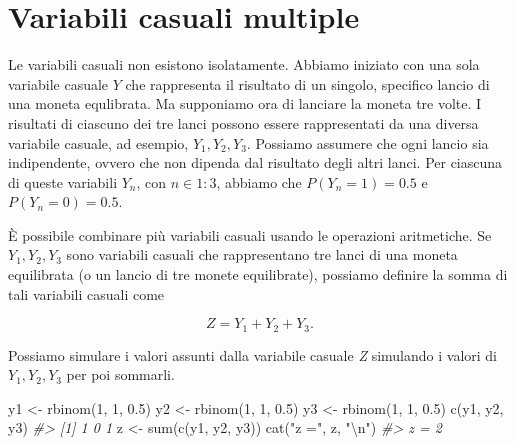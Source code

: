 \documentclass[
  11pt,
]{krantz}
\makeatletter
\newenvironment{Shaded}{\begin{snugshade}}{\end{snugshade}}
\newcommand{\CommentTok}[1]{\textcolor[rgb]{0.37,0.37,0.37}{\textit{#1}}}
\newcommand{\DecValTok}[1]{\textcolor[rgb]{0.06,0.06,0.06}{#1}}
\newcommand{\FloatTok}[1]{\textcolor[rgb]{0.06,0.06,0.06}{#1}}
\newcommand{\FunctionTok}[1]{\textcolor[rgb]{0,0,0}{#1}}
\newcommand{\NormalTok}[1]{#1}
\newcommand{\OtherTok}[1]{\textcolor[rgb]{0.37,0.37,0.37}{#1}}
\newcommand{\SpecialCharTok}[1]{\textcolor[rgb]{0,0,0}{#1}}
\newcommand{\StringTok}[1]{\textcolor[rgb]{0.5,0.5,0.5}{#1}}
\newenvironment{kframe}{%
\medskip{}
\setlength{\fboxsep}{.8em}
 \def\at@end@of@kframe{}%
 \ifinner\ifhmode%
  \def\at@end@of@kframe{\end{minipage}}%
  \begin{minipage}{\columnwidth}%
 \fi\fi%
 \def\FrameCommand##1{\hskip\@totalleftmargin \hskip-\fboxsep
 \colorbox{shadecolor}{##1}\hskip-\fboxsep
     \hskip-\linewidth \hskip-\@totalleftmargin \hskip\columnwidth}%
 \MakeFramed {\advance\hsize-\width
   \@totalleftmargin\z@ \linewidth\hsize
   \@setminipage}}%
 {\par\unskip\endMakeFramed%
 \at@end@of@kframe}
\renewenvironment{Shaded}{\begin{kframe}}{\end{kframe}}
\theoremstyle{definition}
\theoremstyle{definition}
\theoremstyle{definition}
\theoremstyle{definition}
\theoremstyle{remark}
\makeatother
\begin{document}
\hypertarget{variabili-casuali-multiple}{%
\section{Variabili casuali multiple}\label{variabili-casuali-multiple}}

Le variabili casuali non esistono isolatamente. Abbiamo iniziato con una sola variabile casuale \(Y\) che rappresenta il risultato di un singolo, specifico lancio di una moneta equlibrata. Ma supponiamo ora di lanciare la moneta tre volte. I risultati di ciascuno dei tre lanci possono essere rappresentati da una diversa variabile casuale, ad esempio, \(Y_1 , Y_2 , Y_3\). Possiamo assumere che ogni lancio sia indipendente, ovvero che non dipenda dal risultato degli altri lanci. Per ciascuna di queste variabili \(Y_n\), con \(n \in 1:3\), abbiamo che \(P(Y_n =1)=0.5\) e \(P(Y_n =0)=0.5\).

È possibile combinare più variabili casuali usando le operazioni aritmetiche. Se \(Y_1 , Y_2, Y_3\) sono variabili casuali che rappresentano tre lanci di una moneta equilibrata (o un lancio di tre monete equilibrate), possiamo definire la somma di tali variabili casuali come

\[
Z = Y_1 + Y_2 + Y_3.
\]

Possiamo simulare i valori assunti dalla variabile casuale \emph{Z} simulando i valori di \(Y_1, Y_2, Y_3\) per poi sommarli.

\begin{Shaded}
\begin{Highlighting}[]
\NormalTok{y1 }\OtherTok{\textless{}{-}} \FunctionTok{rbinom}\NormalTok{(}\DecValTok{1}\NormalTok{, }\DecValTok{1}\NormalTok{, }\FloatTok{0.5}\NormalTok{)}
\NormalTok{y2 }\OtherTok{\textless{}{-}} \FunctionTok{rbinom}\NormalTok{(}\DecValTok{1}\NormalTok{, }\DecValTok{1}\NormalTok{, }\FloatTok{0.5}\NormalTok{)}
\NormalTok{y3 }\OtherTok{\textless{}{-}} \FunctionTok{rbinom}\NormalTok{(}\DecValTok{1}\NormalTok{, }\DecValTok{1}\NormalTok{, }\FloatTok{0.5}\NormalTok{)}
\FunctionTok{c}\NormalTok{(y1, y2, y3)}
\CommentTok{\#\textgreater{} [1] 1 0 1}
\NormalTok{z }\OtherTok{\textless{}{-}} \FunctionTok{sum}\NormalTok{(}\FunctionTok{c}\NormalTok{(y1, y2, y3))}
\FunctionTok{cat}\NormalTok{(}\StringTok{"z ="}\NormalTok{, z, }\StringTok{"}\SpecialCharTok{\textbackslash{}n}\StringTok{"}\NormalTok{)}
\CommentTok{\#\textgreater{} z = 2}
\end{Highlighting}
\end{Shaded}
\end{document}
